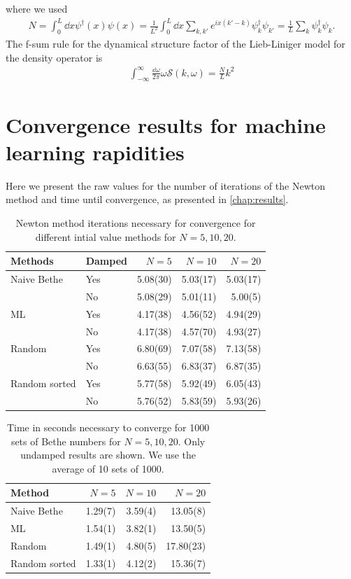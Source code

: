 \documentclass[11pt, a4paper]{report} %
\begin{document}
where we used 
\begin{align}
  \label{eq:6}
  N = \int_0^{L} \dd x \psi^{\dagger}(x) \psi(x)
    = \frac{1}{L^2} \int_{0}^L \dd x \sum_{k,k'} e^{ix(k'-k)} \psi_k^{\dag} \psi_{k'}
    = \frac{1}{L} \sum_k \psi^{\dag}_k \psi_k .
\end{align}
The f-sum rule for the dynamical structure factor of the Lieb-Liniger model for the density operator is
\begin{align}
  \label{eq:16}
  \int_{-\infty}^{\infty} \frac{\dd \omega}{2\pi} \omega \mathcal{S}(k, \omega) = \frac{N}{L}k^2
\end{align}

\chapter{Convergence results for machine learning rapidities}\label{cha:rawvalues}

Here we present the raw values for the number of iterations of the Newton method and time until convergence, as presented in \cref{chap:results}.


\begin{table}[h]
  \centering
  \begin{tabular}{llrrr}
    Methods & Damped & \(N=5\) & \(N=10\) & \(N=20\) \\\hline 
    Naive Bethe & Yes & 5.08(30) & 5.03(17) & 5.03(17) \\ 
           & No & 5.08(29) & 5.01(11) & 5.00(5) \\\hline
    ML & Yes & 4.17(38) & 4.56(52) & 4.94(29) \\
           & No & 4.17(38) & 4.57(70) & 4.93(27) \\\hline
    Random & Yes & 6.80(69) & 7.07(58) & 7.13(58) \\
           & No & 6.63(55) & 6.83(37) & 6.87(35) \\\hline
    Random sorted  & Yes & 5.77(58) & 5.92(49) & 6.05(43)  \\
           & No & 5.76(52) & 5.83(59) & 5.93(26)
  \end{tabular}
  \caption{Newton method iterations necessary for convergence for different intial value methods for \(N=5,10,20\).}
\end{table}


\begin{table}[h]
  \centering
  \begin{tabular}{lrrr}
    Method & \(N=5\) & \(N=10\) & \(N=20\) \\\hline
    Naive Bethe & 1.29(7) & 3.59(4) & 13.05(8)\\
    ML & 1.54(1) & 3.82(1) & 13.50(5)\\
    Random & 1.49(1) & 4.80(5) & 17.80(23) \\
    Random sorted & 1.33(1) & 4.12(2) & 15.36(7) 
  \end{tabular}
  \caption{Time in seconds necessary to converge for 1000 sets of Bethe numbers for \(N=5,10,20\). Only undamped results are shown. We use the average of 10 sets of 1000.}
\end{table}




\end{document}
